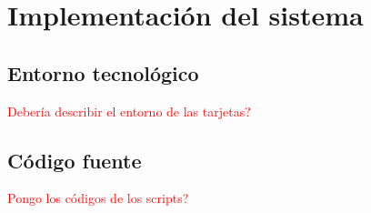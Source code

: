 \chapter{Implementación del sistema}
\section{Entorno tecnológico}
\textcolor{red}{Debería describir el entorno de las tarjetas?}

\section{Código fuente}
\textcolor{red}{Pongo los códigos de los scripts?}
